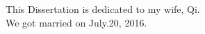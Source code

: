 \raggedleft	
{           }This Dissertation is dedicated to my wife, Qi. \\
{           }We got married on July.20, 2016. 